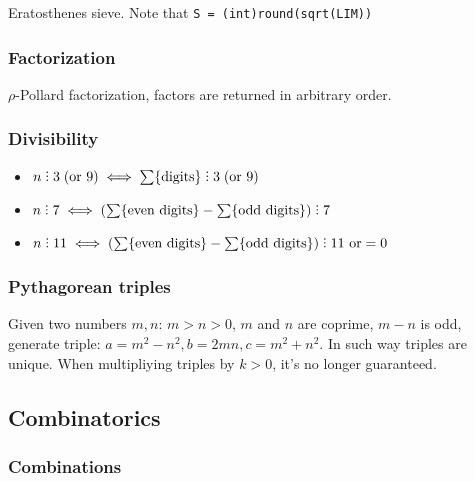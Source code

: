 Eratosthenes sieve. Note that \verb|S = (int)round(sqrt(LIM))|

\subsubsection{Factorization}

$\rho$-Pollard factorization, factors are returned in arbitrary order.

\subsubsection{Divisibility}

\vspace{1em}
\begin{itemize}
  \item $n \divby 3 \;(\text{or } 9) \iff \sum\{\text{digits}\} \divby 3 \;(\text{or } 9)$
  \item $n \divby 7 \iff \left(\sum\{\text{even digits}\} - \sum\{\text{odd digits}\}\right) \divby 7$
  \item $n \divby 11 \iff \left(\sum\{\text{even digits}\} - \sum\{\text{odd digits}\}\right) \divby 11 \text{ or} = 0$
\end{itemize}

\subsubsection{Pythagorean triples}

Given two numbers $m,n$: $m > n > 0$, $m$ and $n$ are coprime, $m - n$ is odd, generate triple: $a = m^2 - n^2, b = 2mn, c = m^2 + n^2$. In such way triples are unique. When multipliying triples by $k > 0$, it's no longer guaranteed.

\subsection{Combinatorics}

\subsubsection{Combinations}

